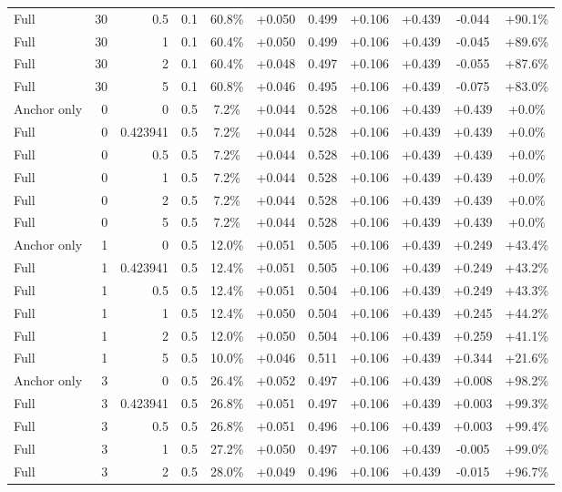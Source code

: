 \begin{table}[htbp]
\begin{tabular}{lrrrccccccc}
Full & 30 & 0.5 & 0.1 & 60.8\% & +0.050 & 0.499 & +0.106 & +0.439 & -0.044 & +90.1\% \\
Full & 30 & 1 & 0.1 & 60.4\% & +0.050 & 0.499 & +0.106 & +0.439 & -0.045 & +89.6\% \\
Full & 30 & 2 & 0.1 & 60.4\% & +0.048 & 0.497 & +0.106 & +0.439 & -0.055 & +87.6\% \\
Full & 30 & 5 & 0.1 & 60.8\% & +0.046 & 0.495 & +0.106 & +0.439 & -0.075 & +83.0\% \\
Anchor only & 0 & 0 & 0.5 & 7.2\% & +0.044 & 0.528 & +0.106 & +0.439 & +0.439 & +0.0\% \\
Full & 0 & 0.423941 & 0.5 & 7.2\% & +0.044 & 0.528 & +0.106 & +0.439 & +0.439 & +0.0\% \\
Full & 0 & 0.5 & 0.5 & 7.2\% & +0.044 & 0.528 & +0.106 & +0.439 & +0.439 & +0.0\% \\
Full & 0 & 1 & 0.5 & 7.2\% & +0.044 & 0.528 & +0.106 & +0.439 & +0.439 & +0.0\% \\
Full & 0 & 2 & 0.5 & 7.2\% & +0.044 & 0.528 & +0.106 & +0.439 & +0.439 & +0.0\% \\
Full & 0 & 5 & 0.5 & 7.2\% & +0.044 & 0.528 & +0.106 & +0.439 & +0.439 & +0.0\% \\
Anchor only & 1 & 0 & 0.5 & 12.0\% & +0.051 & 0.505 & +0.106 & +0.439 & +0.249 & +43.4\% \\
Full & 1 & 0.423941 & 0.5 & 12.4\% & +0.051 & 0.505 & +0.106 & +0.439 & +0.249 & +43.2\% \\
Full & 1 & 0.5 & 0.5 & 12.4\% & +0.051 & 0.504 & +0.106 & +0.439 & +0.249 & +43.3\% \\
Full & 1 & 1 & 0.5 & 12.4\% & +0.050 & 0.504 & +0.106 & +0.439 & +0.245 & +44.2\% \\
Full & 1 & 2 & 0.5 & 12.0\% & +0.050 & 0.504 & +0.106 & +0.439 & +0.259 & +41.1\% \\
Full & 1 & 5 & 0.5 & 10.0\% & +0.046 & 0.511 & +0.106 & +0.439 & +0.344 & +21.6\% \\
Anchor only & 3 & 0 & 0.5 & 26.4\% & +0.052 & 0.497 & +0.106 & +0.439 & +0.008 & +98.2\% \\
Full & 3 & 0.423941 & 0.5 & 26.8\% & +0.051 & 0.497 & +0.106 & +0.439 & +0.003 & +99.3\% \\
Full & 3 & 0.5 & 0.5 & 26.8\% & +0.051 & 0.496 & +0.106 & +0.439 & +0.003 & +99.4\% \\
Full & 3 & 1 & 0.5 & 27.2\% & +0.050 & 0.497 & +0.106 & +0.439 & -0.005 & +99.0\% \\
Full & 3 & 2 & 0.5 & 28.0\% & +0.049 & 0.496 & +0.106 & +0.439 & -0.015 & +96.7\% \\

\end{tabular}
\end{table}

